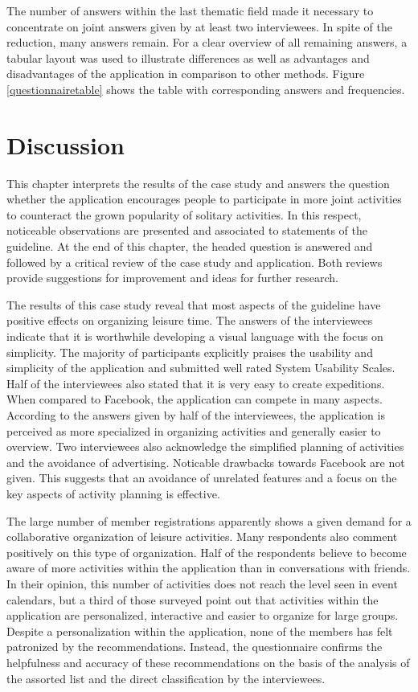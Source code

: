 \documentclass[12pt,numbers=noenddot,parskip,bibliography=totocnumbered,listof=totocnumbered,draft]{scrreprt}
\begin{document}
The number of answers within the last thematic field made it necessary to concentrate on joint answers given by at least two interviewees. In spite of the reduction, many answers remain. For a clear overview of all remaining answers, a tabular layout was used to illustrate differences as well as advantages and disadvantages of the application in comparison to other methods. Figure \ref{questionnairetable} shows the table with corresponding answers and frequencies.

\chapter{Discussion}
This chapter interprets the results of the case study and answers the question whether the application encourages people to participate in more joint activities to counteract the grown popularity of solitary activities. In this respect, noticeable observations are presented and associated to statements of the guideline. At the end of this chapter, the headed question is answered and followed by a critical review of the case study and application. Both reviews provide suggestions for improvement and ideas for further research.

The results of this case study reveal that most aspects of the guideline have positive effects on organizing leisure time. The answers of the interviewees indicate that it is worthwhile developing a visual language with the focus on simplicity. The majority of participants explicitly praises the usability and simplicity of the application and submitted well rated System Usability Scales. Half of the interviewees also stated that it is very easy to create expeditions. When compared to Facebook, the application can compete in many aspects. According to the answers given by half of the interviewees, the application is perceived as more specialized in organizing activities and generally easier to overview. Two interviewees also acknowledge the simplified planning of activities and the avoidance of advertising. Noticable drawbacks towards Facebook are not given. This suggests that an avoidance of unrelated features and a focus on the key aspects of activity planning is effective.

The large number of member registrations apparently shows a given demand for a collaborative organization of leisure activities. Many respondents also comment positively on this type of organization. Half of the respondents believe to become aware of more activities within the application than in conversations with friends. In their opinion, this number of activities does not reach the level seen in event calendars, but a third of those surveyed point out that activities within the application are personalized, interactive and easier to organize for large groups. Despite a personalization within the application, none of the members has felt patronized by the recommendations. Instead, the questionnaire confirms the helpfulness and accuracy of these recommendations on the basis of the analysis of the assorted list and the direct classification by the interviewees.
\end{document}
